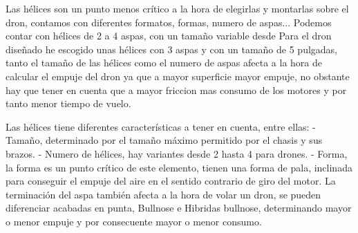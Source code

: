 
 Las hélices son un punto menos crítico a la hora de elegirlas y montarlas sobre el dron, contamos con diferentes formatos, formas, numero de aspas...
 Podemos contar con hélices de 2 a 4 aspas, con un tamaño variable desde 
 Para el dron diseñado he escogido unas hélices con 3 aspas y con un tamaño de 5 pulgadas, tanto el tamaño de las hélices como el numero de aspas afecta a la hora de calcular el empuje del dron ya que a mayor superficie mayor empuje, no obstante hay que tener en cuenta que a mayor friccion mas consumo de los motores y por tanto menor tiempo de vuelo.
                
 Las hélices tiene diferentes características a tener en cuenta, entre ellas:
 - Tamaño, determinado por el tamaño máximo permitido por el chasis y sus brazos.
 - Numero de hélices, hay variantes desde 2 hasta 4 para drones.
 - Forma, la forma es un punto crítico de este elemento, tienen una forma de pala, inclinada para conseguir el empuje del aire en el sentido contrario de giro del motor. La terminación del aspa también afecta a la hora de volar un dron, se pueden diferenciar acabadas en punta,  Bullnose e Hibridas bullnose, determinando mayor o menor empuje y por consecuente mayor o menor consumo.
 
 